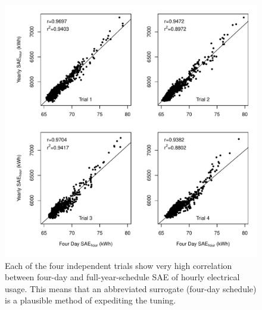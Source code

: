 \documentclass[preprint, review, 12pt]{elsarticle}
\begin{document}
\begin{figure}[htbp]
\centering
\includegraphics[width=5in]{figure1}
\caption{Each of the four independent trials show very high correlation between four-day and full-year-schedule SAE of hourly electrical usage. This means that an abbreviated surrogate (four-day schedule) is a plausible method of expediting the tuning.}
\label{fig:hour-corr}
\end{figure}
\end{document}
